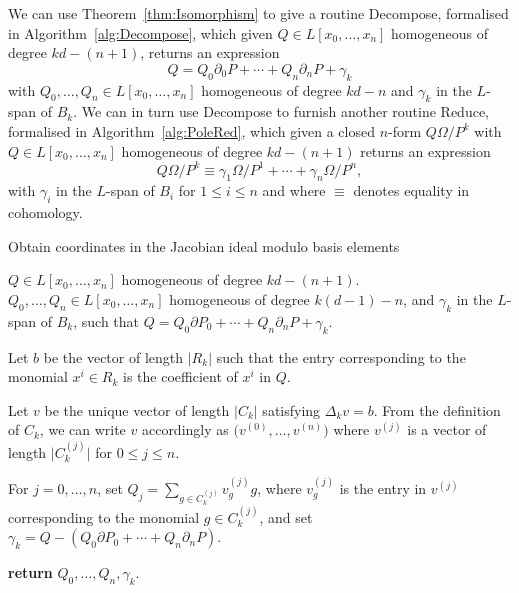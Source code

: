 \documentclass[a4paper,11pt]{article}
\numberwithin{equation}{section}
\providecommand{\abs}[1]{\lvert#1\rvert}                 %
\theoremstyle{definition}
\begin{document}
We can use Theorem~\ref{thm:Isomorphism} to give a routine {\sc Decompose}, 
formalised in Algorithm~\ref{alg:Decompose}, which given 
$Q \in L[x_0, \dotsc, x_n]$ homogeneous of degree $kd - (n+1)$, 
returns an expression 
\begin{equation}
Q = Q_0 \partial_0 P + \dotsb + Q_n \partial_n P + \gamma_k
\end{equation} 
with $Q_0, \dotsc, Q_n \in L[x_0, \dotsc, x_n]$ homogeneous of 
degree $kd-n$ and $\gamma_k$ in the $L$-span of $B_k$. We can in turn 
use {\sc Decompose} to furnish another routine {\sc Reduce}, formalised 
in Algorithm~\ref{alg:PoleRed}, which given a closed $n$-form $Q\Omega/P^k$ 
with $Q \in L[x_0, \dotsc, x_n]$ homogeneous of degree $kd - (n+1)$ returns 
an expression
\begin{equation}
Q \Omega / P^k \equiv \gamma_{1} \Omega / P^{1} + \dotsb + \gamma_n \Omega / P^n,
\end{equation}
with $\gamma_i$ in the $L$-span of $B_i$ for $1 \leq i \leq n$ and 
where $\equiv$ denotes equality in cohomology.

\begin{algorithm}[ht]
\caption{Obtain coordinates in the Jacobian ideal modulo basis elements}
\label{alg:Decompose}
\begin{algorithmic}
\Require $Q \in L[x_0, \dotsc, x_n]$ homogeneous of degree $kd - (n+1)$.
\Ensure  $Q_0, \dotsc, Q_n \in L[x_0, \dotsc, x_n]$ homogeneous of degree 
         $k(d-1)-n$, and $\gamma_k$ in the $L$-span of $B_k$, such that 
         $Q = Q_0 \partial P_0 + \dotsb + Q_n \partial_n P +\gamma_k$.
\State \begin{compactenum}[\it {Step} I.] \vspace{-1.24em}
\item Let $b$ be the vector of length $\abs{R_k}$ such that the entry 
      corresponding to the monomial $x^i \in R_k$ is the coefficient of 
      $x^i$ in $Q$.
\item Let $v$ be the unique vector of length $\abs{C_k}$ satisfying 
      $\Delta_k v = b$.  From the definition of $C_k$, we can write $v$ 
      accordingly as $\bigl(v^{(0)}, \dotsc, v^{(n)}\bigr)$ 
      where $v^{(j)}$ is a vector of length $\abs{C_k^{(j)}}$ 
      for $0 \leq j \leq n$.
\item For $j = 0, \dotsc, n$, set $Q_j = \sum_{g \in C_k^{(j)}} v_g^{(j)} g$,
      where $v_g^{(j)}$ is the entry in $v^{(j)}$ corresponding to the 
      monomial $g \in C_k^{(j)}$, and set $\gamma_k = Q-(Q_0 \partial P_0 + \dotsb + Q_n \partial_n P)$.
\item \textbf{return} $Q_0, \dotsc, Q_n,\gamma_k$.
\end{compactenum}
\EndProcedure
\end{algorithmic}
\end{algorithm}
\end{document}
